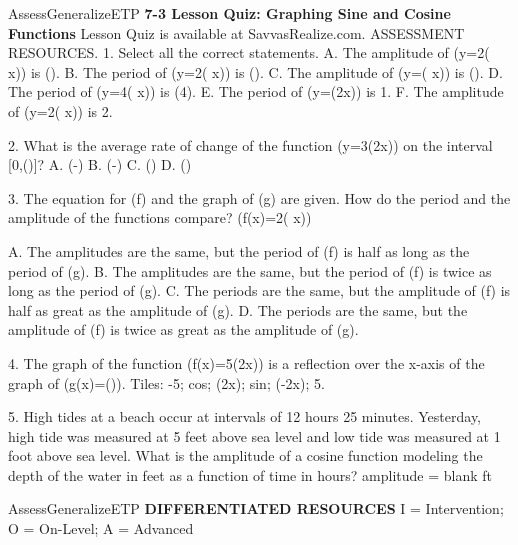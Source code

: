 \documentclass{article}
\newenvironment{te-addendum}[2]{}{}     %
\newcommand{\answer}[1]{}               %
\newcommand{\placeholder}[2]{}          %
\newcommand{\te}[1]{}                   %
\begin{document}
\begin{te-addendum}{Assess}{GeneralizeETP}
\textbf{7-3 Lesson Quiz: Graphing Sine and Cosine Functions}
Lesson Quiz is available at SavvasRealize.com. ASSESSMENT RESOURCES.
1. Select all the correct statements.
A. The amplitude of (y=2\cos( x)) is ().
B. The period of (y=2\cos( x)) is (\pi).
C. The amplitude of (y=\frac{}\sin(\frac{} x)) is (\frac{}).
D. The period of (y=4\pi\sin( x)) is (4\pi).
E. The period of (y=\cos(2\pi x)) is 1.
F. The amplitude of (y=2\sin( x)) is 2.
\answer{1. C, D, E, F.}
2. What is the average rate of change of the function (y=3\sin(2x)) on the interval [0,(\frac{})]?
A. (-\pi)
B. (-\pi)
C. (\pi)
D. (\pi)
\answer{2. D.}
3. The equation for (f) and the graph of (g) are given. How do the period and the amplitude of the functions compare?
(f(x)=2\cos(\frac{} x))
\placeholder{graph}{Quiz3 black periodic graph g with arrowed x,y axes and O; x labels2,4, grid1; y label2, grid1; window roughly-1 to6,-3 to3. Sine curve rises through origin, maxima(1/2,2),(5/2,2),(9/2,2), minima(-1/2,-2),(3/2,-2),(7/2,-2),(11/2,-2); amplitude2 period2, curve end arrows.}
A. The amplitudes are the same, but the period of (f) is half as long as the period of (g).
B. The amplitudes are the same, but the period of (f) is twice as long as the period of (g).
C. The periods are the same, but the amplitude of (f) is half as great as the amplitude of (g).
D. The periods are the same, but the amplitude of (f) is twice as great as the amplitude of (g).
\answer{3. B.}
4. The graph of the function (f(x)=5\cos(2x)) is a reflection over the x-axis of the graph of (g(x)=\underline{\hspace{1cm}}\;\underline{\hspace{1cm}}(\underline{\hspace{1cm}})).
Tiles: -5; cos; (2x); sin; (-2x); 5.
\answer{4. -5; cos; (2x).}
5. High tides at a beach occur at intervals of 12 hours 25 minutes. Yesterday, high tide was measured at 5 feet above sea level and low tide was measured at 1 foot above sea level. What is the amplitude of a cosine function modeling the depth of the water in feet as a function of time in hours?
amplitude = blank ft
\answer{5. 2 ft.}
\te{enVision Algebra2. Assessment Sourcebook. Copyright by Savvas Learning Company LLC. All Rights Reserved.}
\end{te-addendum}
\begin{te-addendum}{Assess}{GeneralizeETP}
\textbf{DIFFERENTIATED RESOURCES}
I = Intervention; O = On-Level; A = Advanced
\te{All four resource previews: Name blank; enVision Algebra2; SavvasRealize.com; enVision Algebra2 Teaching Resources. Copyright by Savvas Learning Company LLC. All Rights Reserved.}
\end{te-addendum}
\end{document}
